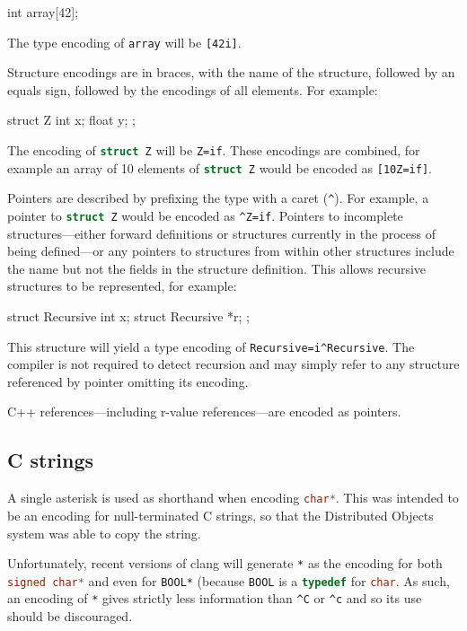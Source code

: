 \documentclass[a4paper]{report}
\newcommand{\ccode}[1]{\lstinline[language={C}]{#1}}
\newcommand{\objc}[1]{\lstinline[language={[Objective]C}]{#1}}
\begin{document}
\begin{codesnippet}
int array[42];
\end{codesnippet}

The type encoding of \ccode{array} will be \texttt{[42i]}.

Structure encodings are in braces, with the name of the structure, followed by an equals sign, followed by the encodings of all elements.
For example:

\begin{codesnippet}
struct Z
{
	int x;
	float y;
};
\end{codesnippet}

The encoding of \ccode{struct Z} will be \texttt{{Z=if}}.
These encodings are combined, for example an array of 10 elements of \ccode{struct Z} would be encoded as \texttt{[10{Z=if}]}.

Pointers are described by prefixing the type with a caret (\texttt{\^{}}).
For example, a pointer to \ccode{struct Z} would be encoded as \texttt{\^{}{Z=if}}.
Pointers to incomplete structures---either forward definitions or structures currently in the process of being defined---or any pointers to structures from within other structures include the name but not the fields in the structure definition.
This allows recursive structures to be represented, for example:

\begin{codesnippet}
struct Recursive
{
	int x;
	struct Recursive *r;
};
\end{codesnippet}

This structure will yield a type encoding of \texttt{{Recursive=i\^{}{Recursive}}}.
The compiler is not required to detect recursion and may simply refer to any structure referenced by pointer omitting its encoding.

C++ references---including r-value references---are encoded as pointers.

\subsection{C strings}

A single asterisk is used as shorthand when encoding \ccode{char*}.
This was intended to be an encoding for null-terminated C strings, so that the Distributed Objects system was able to copy the string.

Unfortunately, recent versions of clang will generate \texttt{*} as the encoding for both \ccode{signed char*} and even for \objc{BOOL*} (because \objc{BOOL} is a \ccode{typedef} for \ccode{char}.
As such, an encoding of \texttt{*} gives strictly less information than \texttt{\^{}C} or \texttt{\^{}c} and so its use should be discouraged.
\end{document}
